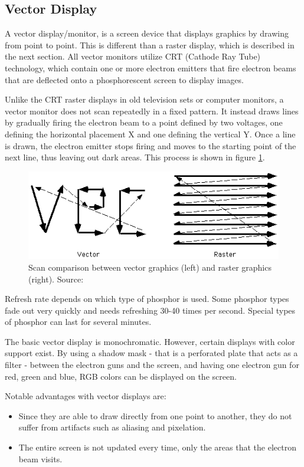 \subsection{Vector Display}
A vector display/monitor, is a screen device that displays graphics by drawing from point to point. 
This is different than a raster display, which is described in the next section.
All vector monitors utilize CRT (Cathode Ray Tube) technology, which contain one or more electron emitters that fire electron beams that are deflected onto a phosphorescent screen to display images.

Unlike the CRT raster displays in old television sets or computer monitors, a vector monitor does not scan repeatedly in a fixed pattern. 
It instead draws lines by gradually firing the electron beam to a point defined by two voltages, one defining the horizontal placement X and one defining the vertical Y. 
Once a line is drawn, the electron emitter stops firing and moves to the starting point of the next line, thus leaving out dark areas. 
This process is shown in figure \ref{fig:vectorscan}.

\begin{figure}[h!]
\centering \includegraphics[width=0.8\linewidth]{images/scan.png}
\caption{Scan comparison between vector graphics (left) and raster graphics (right). Source: \cite{vecvsras}}
\label{fig:vectorscan}
\end{figure}

Refresh rate depends on which type of phosphor is used. 
Some phosphor types fade out very quickly and needs refreshing 30-40 times per second.
Special types of phosphor can last for several minutes.

The basic vector display is monochromatic. 
However, certain displays with color support exist. 
By using a shadow mask - that is a perforated plate that acts as a filter - between the electron guns and the screen, and having one electron gun for red, green and blue, RGB colors can be displayed on the screen.

Notable advantages with vector displays are:
\begin{itemize}
\item Since they are able to draw directly from one point to another, they do not suffer from artifacts such as aliasing and pixelation.
\item The entire screen is not updated every time, only the areas that the electron beam visits.
\end{itemize}

